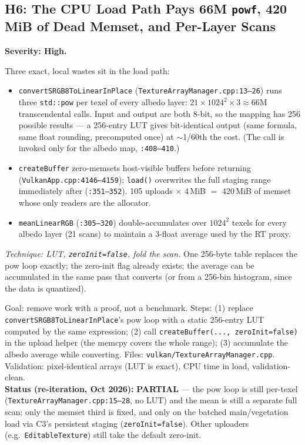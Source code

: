 \documentclass[11pt,a4paper]{article}
\begin{document}
\subsection{H6: The CPU Load Path Pays 66M \texttt{powf}, 420\,MiB of Dead Memset, and Per-Layer Scans}
\label{sec:h6}

\textbf{Severity: High.}

Three exact, local wastes sit in the load path:

\begin{itemize}[leftmargin=1.4em,itemsep=2pt]
\item \texttt{convertSRGB8ToLinearInPlace} (\texttt{TextureArrayManager.cpp:13--26})
runs three \texttt{std::pow} per texel of every albedo layer: $21 \times
1024^2 \times 3 \approx 66$M transcendental calls. Input and output are both
8-bit, so the mapping has 256 possible results --- a 256-entry LUT gives
bit-identical output (same formula, same float rounding, precomputed once) at
$\sim$1/60th the cost. (The call is invoked only for the albedo map,
\texttt{:408--410}.)
\item \texttt{createBuffer} zero-memsets host-visible buffers before returning
(\texttt{VulkanApp.cpp:4146--4159}); \texttt{load()} overwrites the full staging
range immediately after (\texttt{:351--352}). 105 uploads $\times$ 4\,MiB
$=$ 420\,MiB of memset whose only readers are the allocator.
\item \texttt{meanLinearRGB} (\texttt{:305--320}) double-accumulates over
$1024^2$ texels for every albedo layer (21 scans) to maintain a 3-float
average used by the RT proxy.
\end{itemize}

\textit{Technique: LUT, \texttt{zeroInit=false}, fold the scan.} One 256-byte
table replaces the pow loop exactly; the zero-init flag already exists; the
average can be accumulated in the same pass that converts (or from a 256-bin
histogram, since the data is quantized).

\begin{tcolorbox}[promptbox={Prompt --- H6: exact, local load-path waste}]
Goal: remove work with a proof, not a benchmark. Steps: (1) replace
\texttt{convertSRGB8ToLinearInPlace}'s pow loop with a static 256-entry LUT
computed by the same expression; (2) call \texttt{createBuffer(...,
zeroInit=false)} in the upload helper (the memcpy covers the whole range);
(3) accumulate the albedo average while converting. Files:
\texttt{vulkan/TextureArrayManager.cpp}. Validation: pixel-identical arrays
(LUT is exact), CPU time in load, validation-clean.
\\ \textbf{Status (re-iteration, Oct 2026):} \textbf{PARTIAL} --- the pow loop
is still per-texel (\texttt{TextureArrayManager.cpp:15--28}, no LUT) and the
mean is still a separate full scan; only the memset third is fixed, and only
on the batched main/vegetation load via C3's persistent staging
(\texttt{zeroInit=false}). Other uploaders (e.g.\ \texttt{EditableTexture})
still take the default zero-init.
\end{tcolorbox}
\end{document}
